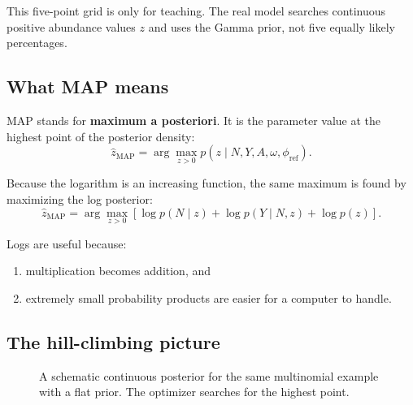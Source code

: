 \documentclass[11pt]{article}
\newcommand{\term}[1]{\textbf{\color{tealdark}#1}}
\begin{document}
\begin{watchout}
This five-point grid is only for teaching. The real model searches continuous
positive abundance values \(z\) and uses the Gamma prior, not five equally likely
percentages.
\end{watchout}

\subsection{What MAP means}

MAP stands for \term{maximum a posteriori}. It is the parameter value at the
highest point of the posterior density:
\[
\boxed{
\widehat z_{\mathrm{MAP}}
=
\arg\max_{z>0}p(z\mid N,Y,A,\omega,\phi_{\mathrm{ref}}).
}
\]

Because the logarithm is an increasing function, the same maximum is found by
maximizing the log posterior:
\[
\widehat z_{\mathrm{MAP}}
=
\arg\max_{z>0}
\left[
\log p(N\mid z)
+\log p(Y\mid N,z)
+\log p(z)
\right].
\]

\begin{bigidea}
Logs are useful because:

\begin{enumerate}[leftmargin=2em]
  \item multiplication becomes addition, and
  \item extremely small probability products are easier for a computer to handle.
\end{enumerate}
\end{bigidea}

\subsection{The hill-climbing picture}

\begin{figure}[H]
\centering
{}
\caption{A schematic continuous posterior for the same multinomial example with a flat prior. The optimizer searches for the highest point.}
\end{figure}
\end{document}
